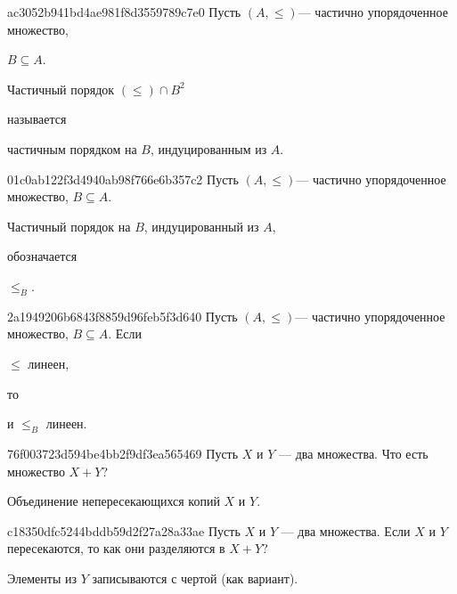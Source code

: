 \begin{note}{ac3052b941bd4ae981f8d3559789c7e0}
    Пусть \({ (A, \leqslant) }\)--- частично упорядоченное множество, \begin{icloze}{3}\({ B \subseteq A }\).\end{icloze}
    \begin{icloze}{2}Частичный порядок \({ (\leqslant) \cap B^2 }\)\end{icloze} называется \begin{icloze}{1}частичным порядком на \({ B }\), индуцированным из \({ A }\).\end{icloze}
\end{note}

\begin{note}{01c0ab122f3d4940ab98f766e6b357c2}
    Пусть \({ (A, \leqslant) }\)--- частично упорядоченное множество, \({ B \subseteq A }\).
    \begin{icloze}{2}Частичный порядок на \({ B }\), индуцированный из \({ A }\),\end{icloze} обозначается \begin{icloze}{1}\({ \leqslant_{B} }\).\end{icloze}
\end{note}

\begin{note}{2a1949206b6843f8859d96feb5f3d640}
    Пусть \({ (A, \leqslant) }\)--- частично упорядоченное множество, \({ B \subseteq A }\).
    Если \begin{icloze}{2}\({ \leqslant }\) линеен,\end{icloze} то \begin{icloze}{1}и \({ \leqslant_{B} }\) линеен.\end{icloze}
\end{note}

\begin{note}{76f003723d594be4bb2f9df3ea565469}
    Пусть \({ X }\) и \({ Y }\) --- два множества.
    Что есть множество \({ X + Y }\)?

    \begin{cloze}{1}
        Объединение непересекающихся копий \({ X }\) и \({ Y }\).
    \end{cloze}
\end{note}

\begin{note}{c18350dfc5244bddb59d2f27a28a33ae}
    Пусть \({ X }\) и \({ Y }\) --- два множества.
    Если \({ X }\) и \({ Y }\) пересекаются, то как они разделяются в \({ X + Y }\)?

    \begin{cloze}{1}
        Элементы из \({ Y }\) записываются с чертой (как вариант).
    \end{cloze}
\end{note}

